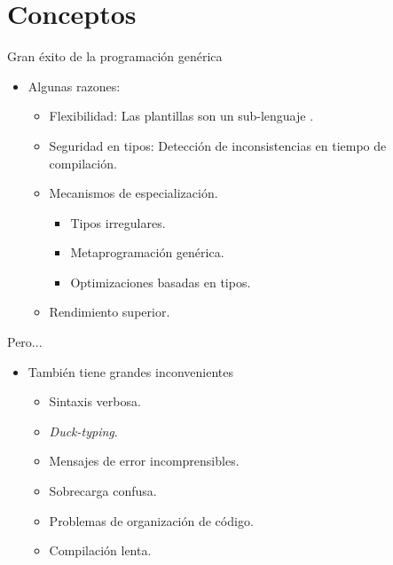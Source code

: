 \section{Conceptos}

\begin{frame}[t]{Gran éxito de la programación genérica}
\begin{itemize}
  \item Algunas razones:
    \begin{itemize}
      \item Flexibilidad: Las plantillas son un sub-lenguaje .

      \vfill\pause
      \item Seguridad en tipos: Detección de inconsistencias en tiempo de compilación.

      \vfill\pause
      \item Mecanismos de especialización.
        \begin{itemize}
          \item Tipos irregulares.
          \item Metaprogramación genérica.
          \item Optimizaciones basadas en tipos.
        \end{itemize}

      \vfill\pause
      \item Rendimiento superior.
    \end{itemize}
\end{itemize}
\end{frame}

\begin{frame}[t]{Pero...}
\begin{itemize}
  \item También tiene grandes inconvenientes
    \begin{itemize}
      \vfill\item Sintaxis verbosa.
      \vfill\item \emph{Duck-typing}.
      \vfill\item Mensajes de error incomprensibles.
      \vfill\item Sobrecarga confusa.
      \vfill\item Problemas de organización de código.
      \vfill\item Compilación lenta.
    \end{itemize}
\end{itemize}
\end{frame}

